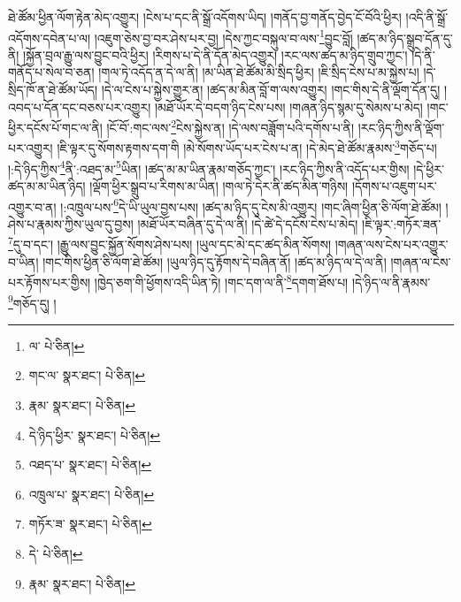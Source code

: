ཐེ་ཚོམ་ཕྱིན་ལོག་རྟེན་མེད་འགྱུར། །ངེས་པ་དང་ནི་སྒྲོ་འདོགས་ཡིད། །གནོད་བྱ་གནོད་བྱེད་ངོ་བོའི་ཕྱིར། །འདི་ནི་སྒྲོ་འདོགས་དབེན་པ་ལ། །འཇུག་ཅེས་བྱ་བར་ཤེས་པར་བྱ། །དེས་ཀྱང་བསྐུལ་བ་ལས་\footnote{ལ་  པེ་ཅིན། }བྱུང་བློ། །ཚད་མ་ཉིད་སྒྲུབ་དོན་དུ་ནི། །སྐྱོན་བྲལ་རྒྱུ་ལས་བྱུང་བའི་ཕྱིར། །རིགས་པ་དེ་ནི་དོན་མེད་འགྱུར། །རང་ལས་ཚད་མ་ཉིད་གྲུབ་ཀྱང་། །དེ་ནི་གནོད་པ་སེལ་བ་ཅན། །གལ་ཏེ་འདོད་ན་དེ་ལ་ནི། །མ་ཡིན་ཐེ་ཚོམ་མི་སྲིད་ཕྱིར། །ཇི་སྲིད་ངེས་པ་མ་སྐྱེས་པ། །དེ་སྲིད་ཁོ་ན་ཐེ་ཚོམ་ཡོད། །དེ་ལ་ངེས་པ་སྐྱེས་གྱུར་ན། །ཚད་མ་མིན་བློ་ག་ལས་འགྱུར། །གང་གིས་དེ་ནི་ལྡོག་དོན་དུ། །འབད་པ་དོན་དང་བཅས་པར་འགྱུར། །མཐོ་ཡོར་དེ་བདག་ཉིད་ངེས་པས། །གཞན་ཉིད་སྙམ་དུ་སེམས་པ་མེད། །གང་ཕྱིར་དངོས་པོ་གང་ལ་ནི། །ངོ་བོ་:གང་ལས་\footnote{གང་ལ་  སྣར་ཐང་།  པེ་ཅིན། }ངེས་སྐྱེས་ན། །དེ་ལས་བཟློག་པའི་དགོས་པ་ནི། །རང་ཉིད་ཀྱིས་ནི་ལྡོག་པར་འགྱུར། །ཇི་ལྟར་དུ་སོགས་རྟགས་དག་གི །མེ་སོགས་ཡོད་པར་ངེས་པ་ན། །དེ་མེད་ཐེ་ཚོམ་རྣམས་\footnote{རྣམ་  སྣར་ཐང་།  པེ་ཅིན། }གཅོད་པ། །:དེ་ཉིད་ཀྱིས་\footnote{དེ་ཉིད་ཕྱིར་  སྣར་ཐང་།  པེ་ཅིན། }ནི་:འཐད་མ་\footnote{འཐད་པ་  སྣར་ཐང་།  པེ་ཅིན། }ཡིན། །ཚད་མ་མ་ཡིན་རྣམ་གཅོད་ཀྱང་། །རང་ཉིད་ཀྱིས་ནི་འདོད་པར་གྱིས། །དེ་ཕྱིར་ཚད་མ་མ་ཡིན་ཉིད། །ལྡོག་ཕྱིར་སྒྲུབ་པ་རིགས་མ་ཡིན། །གལ་ཏེ་དེར་ནི་ཚད་མིན་གཉིས། །དོགས་པ་འཇུག་པར་འགྱུར་བ་ན། །:འཁྲུལ་པས་\footnote{འཁྲུལ་པ་  སྣར་ཐང་།  པེ་ཅིན། }དེ་ཡི་ཡུལ་བྱས་པས། །ཚད་མ་ཉིད་དུ་ངེས་མི་འགྱུར། །གང་ཞིག་ཕྱིན་ཅི་ལོག་ཐེ་ཚོམ། །ཤེས་པ་རྣམས་ཀྱིས་ཡུལ་དུ་བྱས། །མཐོ་ཡོར་བཞིན་དུ་དེ་ལ་ནི། །དེ་ཚེ་དེ་དངོས་ངེས་པ་མེད། །ཇི་ལྟར་:གཏོར་ཟན་\footnote{གཏོར་ཟ་  སྣར་ཐང་།  པེ་ཅིན། }དུ་བ་དང་། །རྒྱུ་ལས་བྱུང་སྐྱོན་སོགས་ཤེས་པས། །ཡུལ་དང་མེ་དང་ཚད་མིན་སོགས། །གཞན་ལས་ངེས་པར་འགྱུར་བ་ཡིན། །གང་གིས་ཕྱིན་ཅི་ལོག་ཐེ་ཚོམ། །ཡུལ་ཉིད་དུ་རྟོགས་དེ་བཞིན་ནོ། །ཚད་མ་ཉིད་ལ་དེ་ལ་ནི། །གཞན་ལ་ངེས་པར་རྟོགས་པར་གྱིས། །ཁྱེད་ཅག་གི་ཕྱོགས་འདི་ཡིན་ཏེ། །གང་དག་ལ་ནི་\footnote{དེ་  པེ་ཅིན། }དགག་ཐོས་པ། །དེ་ཉིད་ལ་ནི་རྣམས་\footnote{རྣམ་  སྣར་ཐང་།  པེ་ཅིན། }གཅོད་དུ། །
